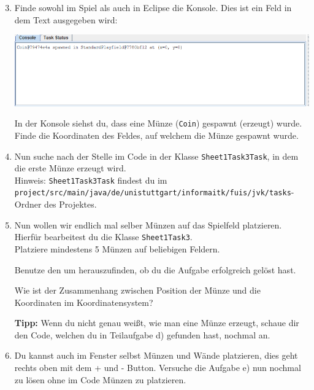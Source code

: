 \begin{enumerate}\setcounter{enumi}{2}

    \item Finde sowohl im Spiel als auch in Eclipse die Konsole. Dies ist ein Feld in dem Text ausgegeben wird:
    \begin{center}
        \includegraphics[width=\linewidth]{./figures/console.PNG}
    \end{center}

    In der Konsole siehst du, dass eine Münze (\texttt{Coin}) gespawnt (erzeugt) wurde.
    Finde die Koordinaten des Feldes, auf welchem die Münze gespawnt wurde.

    \item Nun suche nach der Stelle im Code in der Klasse \lstinline{Sheet1Task3Task}, in dem die erste Münze erzeugt wird.\\
    Hinweis: \lstinline{Sheet1Task3Task} findest du im \lstinline{project/src/main/java/de/unistuttgart/informaitk/fuis/jvk/tasks}-Ordner des Projektes.

    \item Nun wollen wir endlich mal selber Münzen auf das Spielfeld platzieren.
        Hierfür bearbeitest du die Klasse \lstinline{Sheet1Task3}.\\
        Platziere mindestens 5 Münzen auf beliebigen Feldern.

        Benutze den  um herauszufinden, ob du die Aufgabe erfolgreich gelöst hast.

        Wie ist der Zusammenhang zwischen Position der Münze und die Koordinaten im Koordinatensystem?

        \textbf{Tipp:} Wenn du nicht genau weißt, wie man eine Münze erzeugt, schaue dir den Code, welchen du in Teilaufgabe d) gefunden hast, nochmal an.
    \item Du kannst auch im Fenster selbst Münzen und Wände platzieren, dies geht rechts oben mit dem + und - Button. Versuche die Aufgabe e) nun nochmal zu lösen ohne im Code Münzen zu platzieren.
\end{enumerate}
